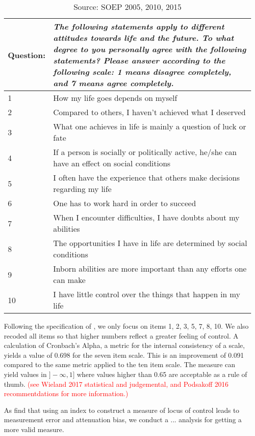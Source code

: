 \documentclass[12pt, a4paper, fleqn, parskip]{scrartcl}
\begin{document}
\begin{table}[h!]
	\begin{tabular}{p{1.5cm} p{14cm}}
	\toprule
	Question: & \textit{The following statements apply to different attitudes
	towards life and the future. To what degree to you personally agree with
	the following statements? Please answer according to the following scale: 1
	means disagree completely, and 7 means agree completely.} \\
	\midrule
	1  & How my life goes depends on myself \\
	2  & Compared to others, I haven't achieved what I deserved \\
	3  & What one achieves in life is mainly a question of luck or fate \\
	4  & If a person is socially or politically active, he/she can have an effect on social conditions \\
	5  & I often have the experience that others make decisions regarding my life \\
	6  & One has to work hard in order to succeed \\
	7  & When I encounter difficulties, I have doubts about my abilities \\
	8  & The opportunities I have in life are determined by social conditions \\
	9  & Inborn abilities are more important than any efforts one can make \\
	10 & I have little control over the things that happen in my life \\
	\bottomrule
	\end{tabular}
	\caption{Source: SOEP 2005, 2010, 2015}
	\label{tab:loc_items}
\end{table}

Following the specification of \citet{specht2013}, we only focus on items 1, 2,
3, 5, 7, 8, 10. We also recoded all items so that higher numbers reflect a
greater feeling of control. A calculation of Cronbach's Alpha, a metric for the
internal consistency of a scale, yields a value of 0.698 for the seven item
scale. This is an improvement of 0.091 compared to the same metric applied to
the ten item scale. The measure can yield values in $]-\infty, 1]$ where values
higher than 0.65 are acceptable as a rule of thumb. \textcolor{red}{(see
Wieland 2017 statistical and judgemental, and Podsakoff 2016 recommentdations
for more information.)}

As \citet{piatek2016} find that using an index to construct a measure of
locus of control leads to measurement error and attenuation bias, we conduct a
... analysis for getting a more valid measure.
\end{document}
